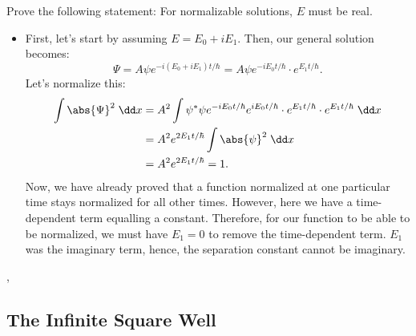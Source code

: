 \begin{example}
    Prove the following statement: For normalizable solutions, $E$ must be real.

    \begin{itemize}
        \item First, let's start by assuming $E = E_0 + iE_1$. Then, our general solution becomes:
            \begin{equation}
                \Psi = A\psi e^{-i(E_0 + iE_1)t/\hbar} = A\psi e^{-iE_0t/\hbar} \cdot e^{E_1t/\hbar}.
            \end{equation}
            Let's normalize this:
            \begin{align}
                \int \abs{\Psi}^2 \;\dd x &= A^2 \int \psi^*\psi e^{-iE_0t/\hbar}e^{iE_0t/\hbar} \cdot e^{E_1t/\hbar} \cdot e^{E_1t/\hbar} \;\dd x \\ 
                &= A^2 e^{2E_1t/\hbar} \int \abs{\psi}^2 \;\dd x \\
                &= A^2 e^{2E_1t/\hbar} = 1.
            \end{align}
            Now, we have already proved that a function normalized at one particular time stays normalized for all other times. However, here we have a time-dependent term equalling a constant. Therefore, for our function to be able to be normalized, we must have $E_1 = 0$ to remove the time-dependent term. $E_1$ was the imaginary term, hence, the separation constant cannot be imaginary.
    \end{itemize}
\end{example}


\sep


\subsection*{The Infinite Square Well}

